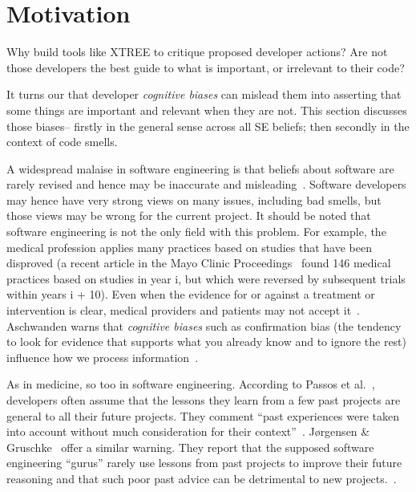 \documentclass{sig-alternate}
\begin{document}


\section{Motivation}\label{sect:prelim}

Why build tools like XTREE to  critique proposed developer actions?
Are not those developers the best guide to what is important, or irrelevant
to their code?

It turns our that developer {\em cognitive biases} can mislead them into
asserting that some things are important and relevant when they are not.
This section discusses those biases-- firstly in the general sense
across all SE beliefs; then secondly in the   context of code smells.

A widespread malaise in software engineering is that
beliefs about software are rarely revised and hence may be
  inaccurate and 
misleading~\cite{passos11,jorgensen09,mei15,me16phase,prem16}. Software developers may hence have very
strong views on many issues, including bad smells, but those views may be wrong for the current
project.
It should be noted that  software engineering is not the only field with this problem.
  For example, the medical profession applies many practices based on studies that have been disproved (a recent article in the Mayo Clinic Proceedings~\cite{prasad13} found 146 medical practices based on studies in year i, but which were reversed by subsequent trials within years i + 10). Even when the evidence for or against a treatment or intervention is clear, medical providers and patients may not accept it~\cite{aschwanden10}. Aschwanden warns that {\em cognitive biases} such as confirmation bias (the tendency to look for evidence that supports what you already know and to ignore the rest) influence how we process information~\cite{aschwanden15}.

As in medicine, so too in software engineering.
According to Passos et al.~\cite{passos11},  developers often  assume that the lessons they learn from a few past projects are general to all their future projects. They comment ``past experiences were taken into account without much consideration for their context''~\cite{passos11}.  J{\o}rgensen \& Gruschke~\cite{jorgensen09} offer a similar warning. They report that the supposed software engineering ``gurus'' rarely use lessons from past projects to improve their future reasoning and that such poor past advice can be detrimental to new projects.~\cite{jorgensen09}. 
\end{document}

